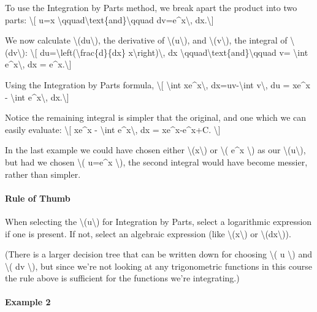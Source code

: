 To use the Integration by Parts method, we break apart the product into
two parts: \textbackslash{}{[} u=x
\textbackslash{}qquad\textbackslash{}text\{and\}\textbackslash{}qquad
dv=e\^{}x\textbackslash{}, dx.\textbackslash{}{]}

We now calculate \textbackslash{}(du\textbackslash{}), the derivative of
\textbackslash{}(u\textbackslash{}), and
\textbackslash{}(v\textbackslash{}), the integral of
\textbackslash{}(dv\textbackslash{}): \textbackslash{}{[}
du=\textbackslash{}left(\textbackslash{}frac\{d\}\{dx\}
x\textbackslash{}right)\textbackslash{}, dx
\textbackslash{}qquad\textbackslash{}text\{and\}\textbackslash{}qquad v=
\textbackslash{}int e\^{}x\textbackslash{}, dx =
e\^{}x.\textbackslash{}{]}

Using the Integration by Parts formula, \textbackslash{}{[}
\textbackslash{}int xe\^{}x\textbackslash{}, dx=uv-\textbackslash{}int
v\textbackslash{}, du = xe\^{}x - \textbackslash{}int
e\^{}x\textbackslash{}, dx.\textbackslash{}{]}

Notice the remaining integral is simpler that the original, and one
which we can easily evaluate: \textbackslash{}{[} xe\^{}x -
\textbackslash{}int e\^{}x\textbackslash{}, dx = xe\^{}x-e\^{}x+C.
\textbackslash{}{]}

In the last example we could have chosen either
\textbackslash{}(x\textbackslash{}) or \textbackslash{}( e\^{}x
\textbackslash{}) as our \textbackslash{}(u\textbackslash{}), but had we
chosen \textbackslash{}( u=e\^{}x \textbackslash{}), the second integral
would have become messier, rather than simpler.

\hypertarget{rule-of-thumb}{%
\paragraph{Rule of Thumb}\label{rule-of-thumb}}

When selecting the \textbackslash{}(u\textbackslash{}) for Integration
by Parts, select a logarithmic expression if one is present. If not,
select an algebraic expression (like \textbackslash{}(x\textbackslash{})
or \textbackslash{}(dx\textbackslash{})).

(There is a larger decision tree that can be written down for choosing
\textbackslash{}( u \textbackslash{}) and \textbackslash{}( dv
\textbackslash{}), but since we're not looking at any trigonometric
functions in this course the rule above is sufficient for the functions
we're integrating.)

\hypertarget{example-2}{%
\paragraph{Example 2}\label{example-2}}


